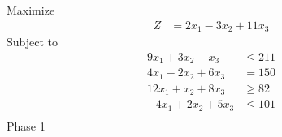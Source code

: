 \documentclass[12pt]{article}
\begin{document}
Maximize
\begin{align*}
Z                     & = 2x_{1}-3x_{2}+11x_{3}
\end{align*}
Subject to
\begin{align*}
9x_{1}+3x_{2}-x_{3}   & \le 211                                                                                                                                                                                                                              \\
4x_{1}-2x_{2}+6x_{3}  & = 150                                                                                                                                                                                                                                \\
12x_{1}+x_{2}+8x_{3}  & \ge 82                                                                                                                                                                                                                               \\
-4x_{1}+2x_{2}+5x_{3} & \le 101                                                                                                                                                                                                                              \\
\end{align*}
Phase 1                                                                                                                                                                                                                                                      \\[5pt]
\end{document}
